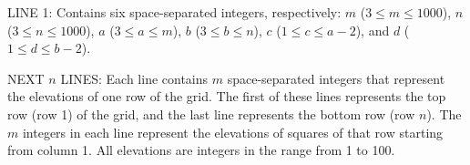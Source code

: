 LINE 1: Contains six space-separated integers, respectively: $m$ ($3 \le m \le 1000$), $n$ ($3 \le n \le 1000$), $a$ ($3 \le a \le m$),
$b$ ($3 \le b \le n$), $c$ ($1 \le c \le a - 2$), and $d$ ($1 \le d \le b-2$).

NEXT $n$ LINES: Each line contains $m$ space-separated integers that
represent the elevations of one row of the grid. The first of these
lines represents the top row (row 1) of the grid, and the last line
represents the bottom row (row $n$). The $m$ integers in each line
represent the elevations of squares of that row starting from
column 1. All elevations are integers in the range from 1 to 100.